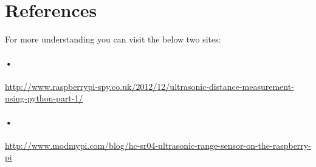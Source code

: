 \documentclass[11pt,a4paper]{article}
\begin{document}
	\section{References}
		For more understanding you can visit the below two sites:
		\paragraph{•}
			\url{http://www.raspberrypi-spy.co.uk/2012/12/ultrasonic-distance-measurement-using-python-part-1/}
			\paragraph{•}
			\url{http://www.modmypi.com/blog/hc-sr04-ultrasonic-range-sensor-on-the-raspberry-pi}
	
\end{document}
